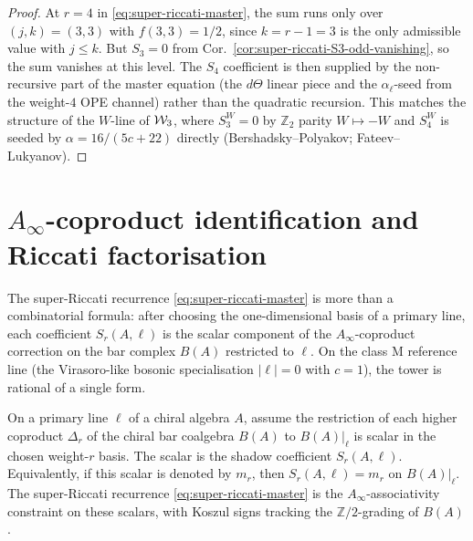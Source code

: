 \begin{proof}[Proof]
At $r = 4$ in \eqref{eq:super-riccati-master}, the sum runs only over
$(j, k) = (3, 3)$ with $f(3, 3) = 1/2$, since $k = r - 1 = 3$ is the
only admissible value with $j \le k$. But $S_3 = 0$ from
Cor.~\ref{cor:super-riccati-S3-odd-vanishing}, so the sum vanishes at
this level. The $S_4$ coefficient is then supplied by the
non-recursive part of the master equation (the $d\Theta$ linear piece and the
$\alpha_\ell$-seed from the weight-$4$ OPE channel) rather than the
quadratic recursion. This matches the structure of the $W$-line of
$\mathcal{W}_3$, where $S_3^W = 0$ by $\mathbb{Z}_2$ parity $W \mapsto -W$
and $S_4^W$ is seeded by $\alpha = 16/(5c + 22)$ directly
(Bershadsky--Polyakov; Fateev--Lukyanov).
\end{proof}

\section{\texorpdfstring{$A_\infty$}{A-inf}-coproduct identification and Riccati factorisation}
\label{sec:super-riccati-ainfty-and-factorisation}

The super-Riccati recurrence \eqref{eq:super-riccati-master} is more than
a combinatorial formula: after choosing the one-dimensional basis of a
primary line, each coefficient $S_r(A, \ell)$ is the scalar component of
the $A_\infty$-coproduct correction on the bar complex $B(A)$ restricted
to $\ell$. On the class M reference line (the
Virasoro-like bosonic specialisation $|\ell| = 0$ with $c = 1$), the
tower is rational of a single form.

\begin{theorem}[Shadow tower = \texorpdfstring{$A_\infty$}{A-inf} coproduct corrections]
\label{thm:shadow-tower-ainfty-coproduct}
On a primary line $\ell$ of a chiral algebra $A$, assume the restriction
of each higher coproduct $\Delta_r$ of the chiral bar coalgebra $B(A)$
to $B(A)|_\ell$ is scalar in the chosen weight-$r$ basis. The scalar is
the shadow coefficient $S_r(A,\ell)$. Equivalently, if this scalar is
denoted by $m_r$, then $S_r(A,\ell)=m_r$ on $B(A)|_\ell$. The
super-Riccati recurrence \eqref{eq:super-riccati-master} is the
$A_\infty$-associativity constraint on these scalars, with Koszul signs
tracking the $\mathbb{Z}/2$-grading of $B(A)$.
\end{theorem}

